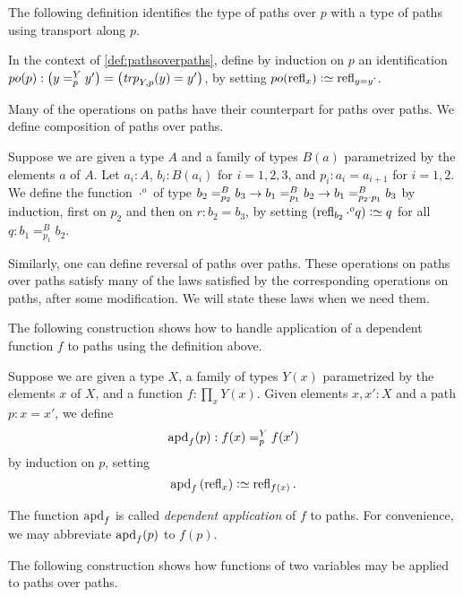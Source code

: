 The following definition identifies the type of paths over $p$ with a type 
of paths using transport along $p$.

\begin{definition}\label{def:pathover-trp}
In the context of \cref{def:pathsoverpaths}, define by induction on $p$ an
identification $po(p): \left(\pathover y Y p {y'}\right) = \left( \trp[Y]{p}(y)=y'\right)$,
by setting $po(\refl{x}) \defeq \refl{y=y'}$.
\end{definition}

Many of the operations on paths have their counterpart for paths over paths.
We define composition of paths over paths.

\begin{definition}\label{def:pathovercomposition}
Suppose we are given a type $A$ and a family of types $B(a)$ parametrized by the elements $a$ of $A$. 
Let $a_i:A$, $b_i:B(a_i)$ for $i=1,2,3$, and $p_i : a_i = a_{i+1}$ for $i=1,2$. 
We define the function $\cdot^o$ of type 
$b_2 =^{B}_{p_2} b_3 \to b_1 =^{B}_{p_1} b_2 \to 
 b_1 =^{B}_{p_2 \cdot p_1} b_3$ by induction, first on $p_2$ and then on $r: b_2 = b_3$,
by setting $(\refl{b_2} \cdot^o q) \defeq q$ for all $q: b_1 =^B_{p_1} b_2$.
\end{definition}

Similarly, one can define reversal of paths over paths. These operations on paths over paths 
satisfy many of the laws satisfied by the corresponding operations on paths, 
after some modification. We will state these laws when we need them. 

The following construction shows how to handle application of a dependent 
function $f$ to paths using the definition above.

\begin{definition}\label{def:apd}
  Suppose we are given a type $X$, a family of types $Y(x)$ parametrized by the elements $x$ of $X$, and a function $f:\prod_x Y(x)$.
  Given elements $x,x':X$ and a path $p : x = x'$, we define $$\apd{f}(p) : \pathover {f(x)} Y p {f(x')}$$ by induction on $p$,
  setting $$\apd f {(\refl x)} \defeq \refl {f(x)}.$$
\end{definition}

The function $\apd f$ is called {\em dependent application} of $f$ to paths.  For convenience, we may abbreviate $\apd f (p)$ to $f(p)$.

The following construction shows how functions of two variables may be applied to paths over paths.

